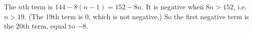 The $n$th term is $144-8(n-1)=152-8n$. It is negative when $8n>152$, i.e.\ $n>19$. (The $19$th term is $0$, which is not negative.) So the first negative term is the $\boxed{20\text{th}}$ term, equal to $-8$.
